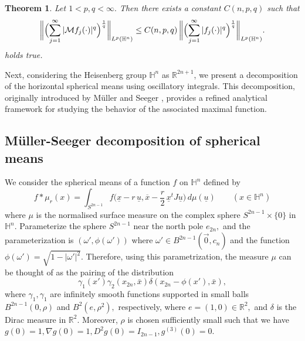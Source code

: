 \documentclass[11pt]{amsart}
\newcommand{\Ha}{\mathbb{H}^n}
\newtheorem{theorem}{Theorem}[section]
\theoremstyle{definition}
\numberwithin{equation}{section}
\begin{document}
\begin{theorem}\cite[Theorem 1.2]{Gra-Scand}
\label{ThmFS}
Let $1<p, q<\infty.$ Then there exists a constant $C(n, p, q)$ such that 
\[
\biggl\|\Bigl(\sum_{j=1}^{\infty}|\mathcal{M} f_j(\cdot)|^q\Bigr)^\frac{1}{q}\biggr\|_{L^p(\Ha)}\leq C(n, p, q)\, \biggl\|\Bigl(\sum_{j=1}^{\infty}|f_j(\cdot)|^q\Bigr)^\frac{1}{q}\biggr\|_{L^p(\Ha)}.
\]
 holds true.
    
\end{theorem}


Next, considering the Heisenberg group $\mathbb{H}^n$ as $\mathbb{R}^{2n+1}$, we present a decomposition of the horizontal spherical means using oscillatory integrals. This decomposition, originally introduced by M\"uller and Seeger \cite{MS}, provides a refined analytical framework for studying the behavior of the associated maximal function.
\subsection{M\"uller-Seeger decomposition of spherical means}
We  consider the spherical means of  a function $f$ on $\mathbb{H}^n$ defined by 
\begin{equation}
	\label{eq:defin}
	f\ast \mu_r(x)=\int_{S^{2n-1}}f\Big(\underline{x}-r\,\underline{u},\overline{x}-\frac{r}2 \, \underline{x}^t J \underline{u}\Big)\,d\mu(\underline{u}) \quad\quad (x\in \Ha)
\end{equation}
where $\mu$ is the normalised surface measure on the complex sphere $S^{2n-1}\times \{0\}$ in $\mathbb{H}^n$.
Parameterize the sphere $S^{2n-1}$ near the north pole $e_{2n},$ and the parameterization is $(\omega', \phi(\omega'))$ where $\omega'\in B^{2n-1}(\vec{0}, c_{n})$ and the function $\phi(\omega')=\sqrt{1-|\omega'|^2}.$ Therefore, using this parametrization, the measure $\mu$ can be thought of as the pairing of the distribution  \[\gamma_1(x') \gamma_2(x_{2n}, \bar{x})  \delta(x_{2n}-\phi(x'), \bar{x}),\] where 
$\gamma_{1}, \gamma_{1}$ are infinitely smooth functions supported in small balls $B^{2n-1}(0, \rho)$ and $B^{2}(e, \rho^2),$ respectively, where $e=(1, 0)\in \mathbb{R}^{2},$ and $\delta$ is the Dirac measure  in $\mathbb{R}^{2}.$ Moreover, $\rho$ is chosen sufficiently small such that we have $g(0)=1, \nabla g(0)=1, D^2g(0)=I_{2n-1}, g^{(3)}(0)=0.$ 
\end{document}
